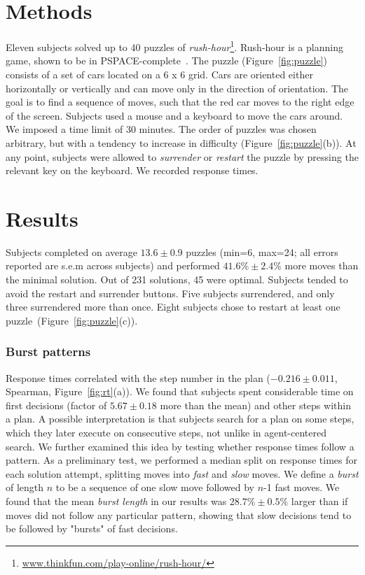\documentclass[10pt,letterpaper]{article}
\begin{document}
\vspace{-0.6cm}
\section{Methods}
\vspace{-0.1cm}
Eleven subjects solved up to 40 puzzles of \emph{rush-hour}\footnote{\url{www.thinkfun.com/play-online/rush-hour/}}. Rush-hour is a planning game, shown to be in PSPACE-complete~\cite{flake2002rush}. The puzzle (Figure~\ref{fig:puzzle}) consists of a set of cars located on a 6 x 6 grid. Cars are oriented either horizontally or vertically and can move only in the direction of orientation. The goal is to find a sequence of moves, such that the red car moves to the right edge of the screen. Subjects used a mouse and a keyboard to move the cars around. We imposed a time limit of 30 minutes. The order of puzzles was chosen arbitrary, but with a tendency to increase in difficulty (Figure~\ref{fig:puzzle}(b)). At any point, subjects were allowed to \emph{surrender} or \emph{restart} the puzzle by pressing the relevant key on the keyboard. We recorded response times. 


\vspace{-0.2cm}
\section{Results}
\vspace{-0.1cm}
Subjects completed on average $13.6 \pm 0.9$ puzzles (min=6, max=24; all errors reported are s.e.m across subjects) and performed $41.6\%\pm2.4\%$ more moves than the minimal solution. Out of 231 solutions, 45 were optimal. Subjects tended to avoid the restart and surrender buttons. Five subjects surrendered, and only three surrendered more than once. Eight subjects chose to restart at least one puzzle~(Figure~\ref{fig:puzzle}(c)).


\subsubsection{Burst patterns}
Response times correlated with the step number in the plan ($-0.216\pm0.011$, Spearman, Figure~\ref{fig:rt}(a)). We found that subjects spent considerable time on first decisions (factor of $5.67\pm0.18$ more than the mean) and other steps within a plan. A possible interpretation is that subjects search for a plan on some steps, which they later execute on consecutive steps, not unlike in agent-centered search. We further examined this idea by testing whether response times follow a pattern. As a preliminary test, we performed a median split on response times for each solution attempt, splitting moves into \emph{fast} and \emph{slow} moves. We define a \emph{burst} of length $n$ to be a sequence of one slow move followed by $n$-1 fast moves. We found that the mean \emph{burst length} in our results was $28.7\%\pm0.5\%$ larger than if moves did not follow any particular pattern, showing that slow decisions tend to be followed by "bursts" of fast decisions. 
\end{document}
